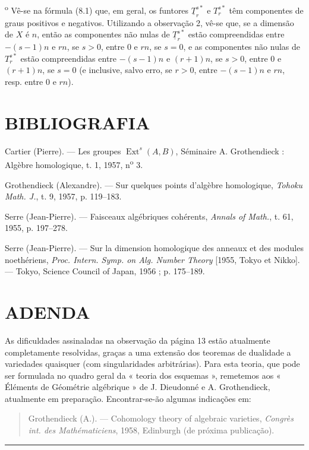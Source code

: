 \medskip
{}\textsuperscript{o} Vê-se na fórmula (8.1) que, em geral, os
funtores $\underline{T}_{r}^{s*}$ e $T_{r}^{s*}$ têm componentes de
graus positivos e negativos. Utilizando a observação 2, vê-se que, se a
dimensão de $X$ é $n$, então as componentes não nulas de
$\underline{T}_{r}^{s*}$ estão compreendidas entre $-(s-1)n$ e $rn$, se $s>0$,
entre $0$ e $rn$, se $s=0$, e as componentes não nulas de $T_{r}^{s*}$
estão compreendidas entre $-(s-1)n$ e $(r+1)n$, se $s>0$, entre $0$ e $(r+1)n$,
se $s=0$ (e inclusive, salvo erro, se $r>0$, entre $-(s-1)n$ e $rn$, resp. entre
$0$ e $rn$).

\section*{BIBLIOGRAFIA}

\noindent[1] Cartier (Pierre). --- Les groupes
$\operatorname{Ext}^{s}(A,B)$, Séminaire A. Grothendieck : Algèbre homologique,
t. 1, 1957, n\textsuperscript{o} 3.

\noindent[2] Grothendieck (Alexandre). --- Sur quelques points d'algèbre
homologique, \emph{Tohoku Math. J.}, t. 9, 1957, p. 119--183.

\noindent[3] Serre (Jean-Pierre). --- Faisceaux algébriques cohérents,
\emph{Annals of Math.}, t. 61, 1955, p. 197--278.

\noindent[4] Serre (Jean-Pierre). --- Sur la dimension homologique des anneaux
et des modules noethériens, \emph{Proc. Intern. Symp. on Alg. Number Theory}
[1955, Tokyo et Nikko]. --- Tokyo, Science Council of Japan, 1956 ;
p. 175--189.

\clearpage
{}
\section*{ADENDA}

As dificuldades assinaladas na observação da página 13 estão atualmente
completamente resolvidas, graças a uma extensão dos teoremas de dualidade a
variedades quaisquer (com singularidades arbitrárias). Para esta teoria, que pode
ser formulada no quadro geral da « teoria dos esquemas », remetemos
aos « Éléments de Géométrie algébrique » de J. Dieudonné e A. Grothendieck,
atualmente em preparação. Encontrar-se-ão algumas indicações em:

\begin{quote}
Grothendieck (A.). --- Cohomology theory of algebraic varieties,
\emph{Congrès int. des Mathématiciens}, 1958, Edinburgh (de próxima publicação).
\end{quote}

\begin{flushright}
[Abril de 1959]
\end{flushright}

\begin{center}\rule{36mm}{0.5pt}\end{center}
